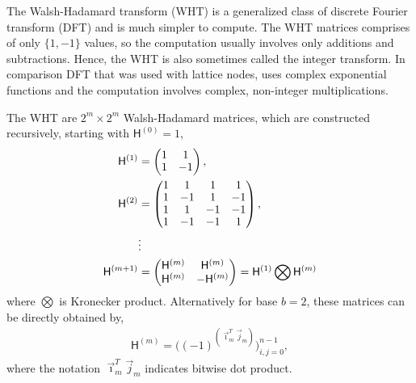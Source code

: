 \documentclass{iitthesis}          %
\newcommand{\mH}{\mathsf{H}}
\newcommand{\JRNote}[1]{{\textcolor{green}{JR: #1}}}
\begin{document}
The Walsh-Hadamard transform (WHT) is a generalized class of discrete Fourier transform (DFT) and is much simpler to compute. The WHT matrices comprises of only $\{1, -1\}$ values, so the computation usually involves only additions and subtractions. Hence, the WHT is also sometimes called the integer transform. In comparison DFT that was used with lattice nodes,  uses complex exponential functions and the computation involves complex, non-integer multiplications. 

The WHT are $2^m \times 2^m$ Walsh-Hadamard matrices, which are constructed recursively, starting with $\mH^{(0)} = 1$,
\begin{align}
\nonumber
\arraycolsep=1.4pt\def\arraystretch{0.9}
\mH^{(1)} &=
\begin{pmatrix}
1 & 1 \\ 1 & -1
\end{pmatrix}, \\
\nonumber
\mH^{(2)} &= 
\begin{pmatrix}
1 & 1 & 1 & 1 \\ 
1 & -1 & 1 & -1 \\
1 & 1 & -1 & -1 \\ 
1 & -1 & -1 & 1 \\
\end{pmatrix}, \\
\nonumber
& \vdots
\\
\label{eqn:hadamard_matrix}
\mH^{({m+1})} &= 
\begin{pmatrix}
\mH^{(m)} & \mH^{(m)} \\ \mH^{(m)} & -\mH^{(m)}
\end{pmatrix} = \mH^{(1)} \bigotimes \mH^{(m)}
\end{align}
where $\bigotimes$ is Kronecker product. Alternatively for base $b=2$, these matrices can be  directly obtained by,
\begin{align*}
\mH^{(m)} %
= \bigg((-1)^{(\vec{\imath}_m^T \vec{j}_m)} \bigg)_{i,j=0}^{n-1},
\end{align*}
where the notation $\vec{\imath}_m^T \vec{j}_m$ indicates bitwise dot product. 
\end{document}
